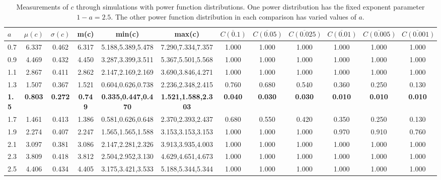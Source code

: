 \begin{table*}[h!]
\begin{center}
\begin{tabular}{| l | c | c | c | c | c | c | c | c | c | c | c |}\hline
$a$ & $\mu(c)$ & $\sigma(c)$ & m(c) & min(c) & max(c) & $\overline{C(0.1)}$ & $\overline{C(0.05)}$ & $\overline{C(0.025)}$ & $\overline{C(0.01)}$ & $\overline{C(0.005)}$ & $\overline{C(0.001)}$ \\\hline\hline
0.7 & 6.337 & 0.462 & 6.317 & 5.188,5.389,5.478 & 7.290,7.334,7.357  & 1.000  & 1.000  & 1.000  & 1.000  & 1.000  & 1.000 \\\hline
0.9 & 4.469 & 0.432 & 4.450 & 3.287,3.399,3.511 & 5.367,5.501,5.568  & 1.000  & 1.000  & 1.000  & 1.000  & 1.000  & 1.000 \\\hline
1.1 & 2.867 & 0.411 & 2.862 & 2.147,2.169,2.169 & 3.690,3.846,4.271  & 1.000  & 1.000  & 1.000  & 1.000  & 1.000  & 1.000 \\\hline
1.3 & 1.507 & 0.367 & 1.521 & 0.604,0.626,0.738 & 2.236,2.348,2.415  & 0.760  & 0.680  & 0.540  & 0.360  & 0.250  & 0.130 \\\hline
{\bf 1.5} & {\bf 0.803} & {\bf 0.272} & {\bf 0.749} & {\bf 0.335,0.447,0.470} & {\bf 1.521,1.588,2.303} & {\bf 0.040} & {\bf 0.030} & {\bf 0.030} & {\bf 0.010} & {\bf 0.010} & {\bf 0.010} \\\hline
1.7 & 1.461 & 0.413 & 1.386 & 0.581,0.626,0.648 & 2.370,2.393,2.437  & 0.680  & 0.550  & 0.420  & 0.350  & 0.250  & 0.130 \\\hline
1.9 & 2.274 & 0.407 & 2.247 & 1.565,1.565,1.588 & 3.153,3.153,3.153  & 1.000  & 1.000  & 1.000  & 0.970  & 0.910  & 0.760 \\\hline
2.1 & 3.097 & 0.381 & 3.086 & 2.147,2.281,2.326 & 3.913,3.935,4.003  & 1.000  & 1.000  & 1.000  & 1.000  & 1.000  & 1.000 \\\hline
2.3 & 3.809 & 0.418 & 3.812 & 2.504,2.952,3.130 & 4.629,4.651,4.673  & 1.000  & 1.000  & 1.000  & 1.000  & 1.000  & 1.000 \\\hline
2.5 & 4.406 & 0.434 & 4.405 & 3.175,3.421,3.533 & 5.188,5.344,5.344  & 1.000  & 1.000  & 1.000  & 1.000  & 1.000  & 1.000 \\\hline
\end{tabular}
\caption{Measurements of $c$ through simulations
with power function distributions.
One power distribution has the fixed exponent parameter $1-a=2.5$.
The other power function distribution in each comparison
has varied values of $a$.}
\end{center}
\end{table*}
